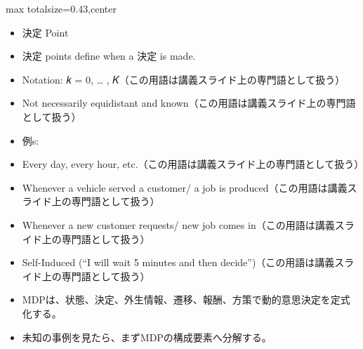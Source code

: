 \clearpage
{}
\begin{minipage}[t]{0.405\textwidth}
\begin{adjustbox}{max totalsize={\textwidth}{0.43\textheight},center}
\begin{minipage}{\textwidth}\scriptsize
{}\begin{itemize}
\item 決定 Point
\item 決定 points define when a 決定 is made.
\item Notation: 𝑘 = 0, … , 𝐾（この用語は講義スライド上の専門語として扱う）
\item Not necessarily equidistant and known（この用語は講義スライド上の専門語として扱う）
\item 例s:
\item Every day, every hour, etc.（この用語は講義スライド上の専門語として扱う）
\item Whenever a vehicle served a customer/ a job is produced（この用語は講義スライド上の専門語として扱う）
\item Whenever a new customer requests/ new job comes in（この用語は講義スライド上の専門語として扱う）
\item Self-Induced (“I will wait 5 minutes and then decide”)（この用語は講義スライド上の専門語として扱う）
\end{itemize}\begin{itemize}
\item MDPは、状態、決定、外生情報、遷移、報酬、方策で動的意思決定を定式化する。
\item 未知の事例を見たら、まずMDPの構成要素へ分解する。
\end{itemize}
\end{minipage}
\end{adjustbox}
\end{minipage}\hfill
